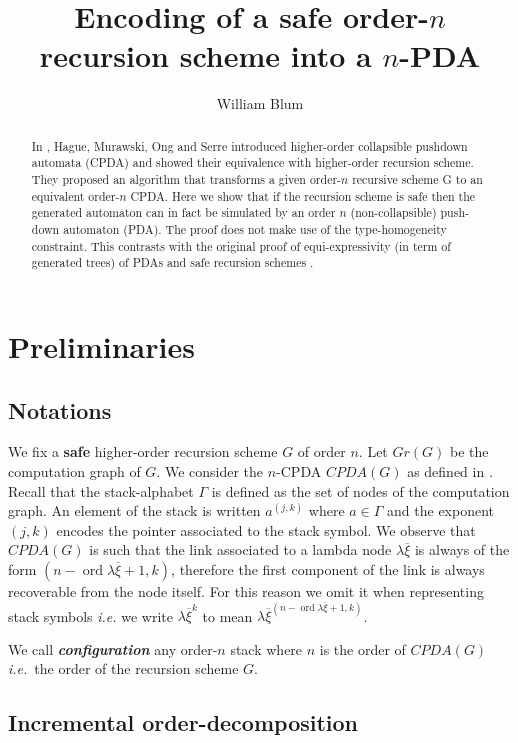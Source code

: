\documentclass{article}
\author{William Blum}
\title{Encoding of a safe order-$n$ recursion scheme into a $n$-PDA}
\newcommand{\ord}{\mathop{\mathrm{ord}}}
\newcommand\defname[1]{{\bf\em #1}\index{#1}}
\theoremstyle{remark}
\theoremstyle{definition}
\def\ie{{\it i.e.}\ }
\begin{document}
\maketitle
\begin{abstract}
In \cite{hague-sto07}, Hague, Murawski, Ong and Serre introduced
higher-order collapsible pushdown automata (CPDA) and showed their
equivalence with higher-order recursion scheme. They proposed an
algorithm that transforms a given order-$n$ recursive  scheme G to
an equivalent order-$n$ CPDA. Here we show that if the recursion
scheme is safe then the generated automaton can in fact be simulated by an order
$n$ (non-collapsible) push-down automaton (PDA). The proof does not make
use of the type-homogeneity constraint. This contrasts with the original proof
of equi-expressivity (in term of generated trees) of PDAs and safe recursion schemes \cite{KNU02}.
\end{abstract}


\section{Preliminaries}

\subsection{Notations}

We fix a {\bf safe} higher-order recursion scheme $G$ of order $n$. Let $Gr(G)$ be the computation graph of $G$.
We consider the $n$-CPDA $CPDA(G)$ as defined in \cite[Definition 5.2]{hague-sto07}.
Recall that the stack-alphabet $\Gamma$ is defined as the set of nodes of the computation graph.
An element of the stack is written $a^{(j,k)}$ where $a\in \Gamma$ and the exponent $(j,k)$
encodes the pointer associated to the stack symbol. We observe that $CPDA(G)$ is such that the link associated to a lambda node $\lambda \overline{\xi}$ is always of the form $(n-\ord{\lambda \overline{\xi}}+1, k)$, therefore the first component of the link is always recoverable from the node itself. For this reason we omit it when representing stack symbols {\it i.e.} we write $\lambda \overline{\xi}^{k}$ to mean $\lambda \overline{\xi}^{(n-\ord{\lambda \overline{\xi}}+1,k)}$.


We call \defname{configuration} any order-$n$ stack where $n$ is the order
of $CPDA(G)$ \ie the order of the recursion scheme $G$.




\subsection{Incremental order-decomposition}
\end{document}
